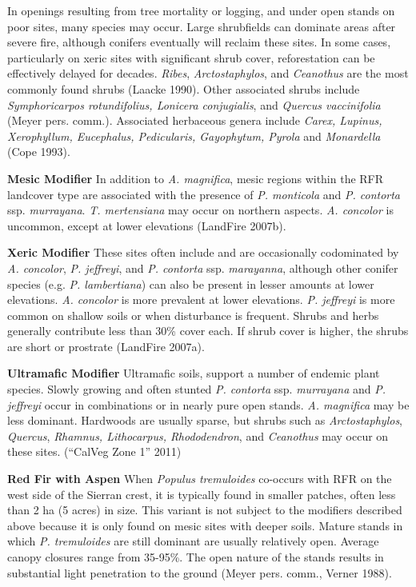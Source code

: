 In openings resulting from tree mortality or logging, and under open stands on poor sites, many species may occur. Large shrubfields can dominate areas after severe fire, although conifers eventually will reclaim these sites. In some cases, particularly on xeric sites with significant shrub cover, reforestation can be effectively delayed for decades. \emph{Ribes}, \emph{Arctostaphylos}, and \emph{Ceanothus} are the most commonly found shrubs (Laacke 1990). Other associated shrubs include \emph{Symphoricarpos rotundifolius, Lonicera conjugialis}, and \emph{Quercus vaccinifolia} (Meyer pers. comm.). Associated herbaceous genera include \emph{Carex, Lupinus, Xerophyllum, Eucephalus, Pedicularis, Gayophytum, Pyrola} and \emph{Monardella} (Cope 1993).



\begin{adjustwidth}{2cm}{}
\noindent \textbf{Mesic Modifier } In addition to \emph{A. magnifica}, mesic regions within the RFR landcover type are associated with the presence of \emph{P. monticola} and \emph{P. contorta} ssp. \emph{murrayana}. \emph{T. mertensiana} may occur on northern aspects. \emph{A. concolor} is uncommon, except at lower elevations (LandFire 2007b).

\medskip
\noindent \textbf{Xeric Modifier}  These sites often include and are occasionally codominated by \emph{A. concolor}, \emph{P. jeffreyi}, and \emph{P. contorta} ssp. \emph{marayanna}, although other conifer species (e.g. \emph{P. lambertiana}) can also be present in lesser amounts at lower elevations. \emph{A. concolor} is more prevalent at lower elevations. \emph{P. jeffreyi} is more common on shallow soils or when disturbance is frequent. Shrubs and herbs generally contribute less than 30\% cover each. If shrub cover is higher, the shrubs are short or prostrate (LandFire 2007a).

\medskip
\noindent \textbf{Ultramafic Modifier} Ultramafic soils, support a number of endemic plant species. Slowly growing and often stunted \emph{P. contorta} ssp. \emph{murrayana} and \emph{P. jeffreyi} occur in combinations or in nearly pure open stands. \emph{A. magnifica} may be less dominant. Hardwoods are usually sparse, but shrubs such as \emph{Arctostaphylos}, \emph{Quercus}, \emph{Rhamnus, Lithocarpus, Rhododendron}, and \emph{Ceanothus} may occur on these sites. (``CalVeg Zone 1'' 2011)

\end{adjustwidth}

\noindent \textbf{Red Fir with Aspen} When \emph{Populus tremuloides} co-occurs with RFR on the west side of the Sierran crest, it is typically found in smaller patches, often less than 2 ha (5 acres) in size. This variant is not subject to the modifiers described above because it is only found on mesic sites with deeper soils. Mature stands in which \emph{P. tremuloides} are still dominant are usually relatively open. Average canopy closures range from 35-95\%. The open nature of the stands results in substantial light penetration to the ground (Meyer pers. comm., Verner 1988).




